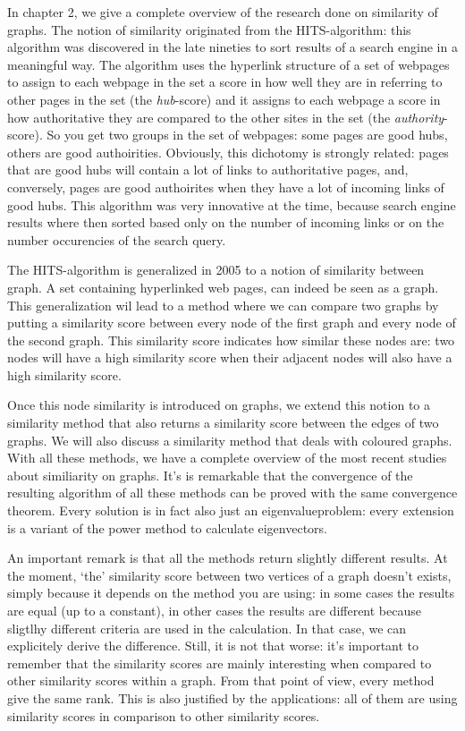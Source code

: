 \documentclass[a4paper,11pt]{report}
\begin{document}
In chapter 2, we give a complete overview of the research done on similarity of 
graphs. The notion of similarity originated from the HITS-algorithm: this 
algorithm was discovered in the late nineties to sort results of a search 
engine in a meaningful way. The algorithm uses the hyperlink structure of a set 
of webpages to assign to each webpage in the set a score in how well they are in referring to other pages
in the set (the \emph{hub}-score)  and it assigns to each webpage a score in how 
authoritative they are compared to the other sites in the set (the 
\emph{authority}-score). So you get two groups in the set of webpages: some pages are good hubs, others are good
authoirities. Obviously, this dichotomy is strongly related: pages that are good 
hubs will contain a lot of links to authoritative pages, and, conversely, pages 
are good authoirites when they have a lot of incoming links of good hubs. This 
algorithm was very innovative at the time, because search engine results where 
then sorted based only on the number of incoming links or on the number 
occurencies of the search query.

The HITS-algorithm is generalized in 2005 to a notion of similarity between 
graph. A set containing hyperlinked web pages, can indeed be seen as a graph. 
This generalization wil lead to a method where we can compare two graphs by putting a similarity score
between every node of the first graph and every node of the second graph. This similarity score 
indicates how similar these nodes are: two nodes will have a high similarity 
score when their adjacent nodes will also have a high similarity score. 

Once this node similarity is introduced on graphs, we extend this notion to a 
similarity method that also returns a similarity score between the edges of two 
graphs. We will also discuss a similarity method that deals with coloured 
graphs. With all these methods, we have a complete overview of the most recent 
studies about similiarity on graphs. It's is remarkable that the convergence of 
the resulting algorithm of all these methods can be proved with the same 
convergence theorem. Every solution is in fact also just an eigenvalueproblem: 
every extension is a variant of the power method to calculate eigenvectors.

An important remark is that all the methods return slightly different results. 
At the moment, `the' similarity score between two vertices of a graph doesn't 
exists, simply because it depends on the method you are using: in some cases the 
results are equal (up to a constant), in other cases the results are 
different because sligtlhy different criteria are used in the calculation. In 
that case, we can explicitely derive the difference.
Still, it is not that worse: it's important to remember that the similarity 
scores are mainly interesting when compared to other similarity scores within a graph. From that point of view,
every method give the same rank. This is also justified by the applications: all 
of them are using similarity scores in comparison to other similarity scores. 
\end{document}
